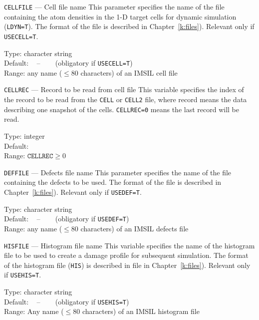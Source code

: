 \begin{keydescription}{\texttt{CELLFILE} --- Cell file name}
%
  This parameter specifies the name of the file containing the atom
  densities in the 1-D target cells for dynamic simulation
  (\texttt{LDYN=T}). The format of the file is described in
  Chapter~\ref{k:files}). Relevant only if \texttt{USECELL=T}.
  
  \begin{keytab}
    Type:    \> character string \\
    Default: \> ~ -- ~~~ (obligatory if \texttt{USECELL=T}) \\
    Range:   \> any name ($\le 80$ characters) of an IMSIL cell file
  \end{keytab}
\end{keydescription}

\begin{keydescription}{\texttt{CELLREC} --- Record to be read from
cell file}
%
  This variable specifies the index of the record to be read from the
  \texttt{CELL} or \texttt{CELL2} file, where record means the
  data describing one snapshot of the cells. \texttt{CELLREC=0} means the last
  record will be read.

  \begin{keytab}
    Type:    \> integer \\
    Default:  \\
    Range:   \> $\texttt{CELLREC} \ge 0$
  \end{keytab}
\end{keydescription}

\ifprivate
\begin{keydescription}{\texttt{DEFFILE} --- Defects file name}
%
  This parameter specifies the name of the file containing the defects to be
  used. The format of the file is described in Chapter~\ref{k:files}). Relevant
  only if \texttt{USEDEF=T}.
  
  \begin{keytab}
    Type:    \> character string \\
    Default: \> ~ -- ~~~ (obligatory if \texttt{USEDEF=T}) \\
    Range:   \> any name ($\le 80$ characters) of an IMSIL defects file
  \end{keytab}
\end{keydescription}
\fi

\begin{keydescription}{\texttt{HISFILE} --- Histogram file name}
%
  This variable specifies the name of the histogram file to be used to create
  a damage profile for subsequent simulation. The format of the histogram file
  (\texttt{HIS}) is described in file in Chapter~\ref{k:files}). Relevant only
  if \texttt{USEHIS=T}.
%
  \begin{keytab}
    Type:    \> character string \\
    Default: \> ~ -- ~~~ (obligatory if \texttt{USEHIS=T}) \\
    Range:   \> Any name ($\le 80$ characters) of an IMSIL histogram file 
  \end{keytab}
\end{keydescription}

